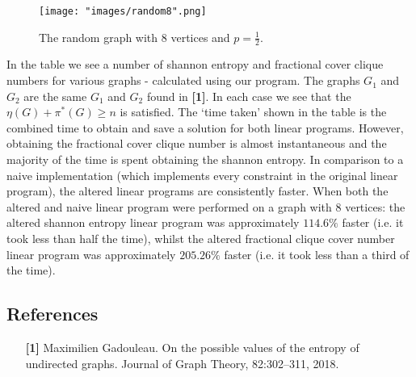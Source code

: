 \documentclass[12pt, a4paper]{article}
\begin{document}
\begin{wrapfigure}{r}{0.3\textwidth}
  \begin{center}
    \texttt{[image: "images/random8".png]}
  \end{center}
  \caption{The random graph with $8$ vertices and $p=\frac{1}{2}$.}
  \label{fig:rand}
\end{wrapfigure}
In the table we see a number of shannon entropy and fractional cover clique numbers for various graphs - calculated using our program. The graphs $G_1$ and $G_2$ are the same $G_1$ and $G_2$ found in \textbf{[1]}. In each case we see that the $\eta(G) + \pi^*(G) \geq n$ is satisfied.
The `time taken' shown in the table is the combined time to obtain and save a solution for both linear programs. However, obtaining the fractional cover clique number is almost instantaneous and the majority of the time is spent obtaining the shannon entropy. In comparison to a naive implementation (which implements every constraint in the original linear program), the altered linear programs are consistently faster. When both the altered and naive linear program were performed on a graph with $8$ vertices: the altered shannon entropy linear program was approximately $114.6\%$ faster (i.e. it took less than half the time), whilst the altered fractional clique cover number linear program was approximately $205.26\%$ faster (i.e. it took less than a third of the time).
\subsection*{References}
\begin{enumerate}[label=(\arabic*),leftmargin=2\parindent]
\itemsep0em
\item[\textbf{[1]}]Maximilien Gadouleau. On the possible values of the entropy of undirected graphs. Journal of Graph Theory, 82:302–311, 2018.
\end{enumerate}
\end{document}
